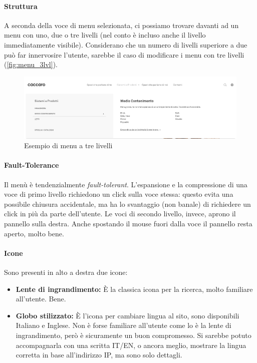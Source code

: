 \paragraph*{Struttura} A seconda della voce di menu selezionata, ci possiamo trovare davanti ad un menu con uno, due o tre livelli (nel conto è incluso anche il livello immediatamente visibile). Considerano che un numero di livelli superiore a due può far innervosire l'utente, sarebbe il caso di modificare i menu con tre livelli (\autoref{fig:menu_3lvl}).

\begin{figure}
	\centering
	\includegraphics[width=\textwidth]{sez/Elementi_Comuni/img/menu_3lvl.png}
	\caption{Esempio di menu a tre livelli}
	\label{fig:menu_3lvl}
\end{figure}

\paragraph*{Fault-Tolerance} Il menù è tendenzialmente \textit{fault-tolerant}. L'espansione e la compressione di una voce di primo livello richiedono un click sulla voce stessa: questo evita una possibile chiusura accidentale, ma ha lo svantaggio (non banale) di richiedere un click in più da parte dell'utente. 
Le voci di secondo livello, invece, aprono il pannello sulla destra. Anche spostando il mouse fuori dalla voce il pannello resta aperto, molto bene.

\paragraph*{Icone} Sono presenti in alto a destra due icone:
\begin{itemize}
\item \textbf{Lente di ingrandimento:} \`E la classica icona per la ricerca, molto familiare all'utente. Bene.
\item \textbf{Globo stilizzato:} \`E l'icona per cambiare lingua al sito, sono disponibili Italiano e Inglese. Non è forse familiare all'utente come lo è la lente di ingrandimento, però è sicuramente un buon compromesso. Si sarebbe potuto accompagnarla con una scritta IT/EN, o ancora meglio, mostrare la lingua corretta in base all'indirizzo IP, ma sono solo dettagli.
\end{itemize}